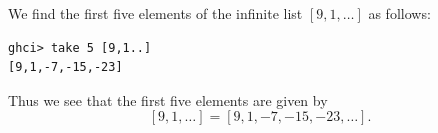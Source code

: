 We find the first five elements of the infinite list 
$[9, 1, \ldots]$ as follows:
\begin{lstlisting}
ghci> take 5 [9,1..]
[9,1,-7,-15,-23]
\end{lstlisting}
Thus we see that the first five elements are given by
\[
    [9, 1, \ldots] = [9, 1, -7, -15, -23, \ldots].
\]

